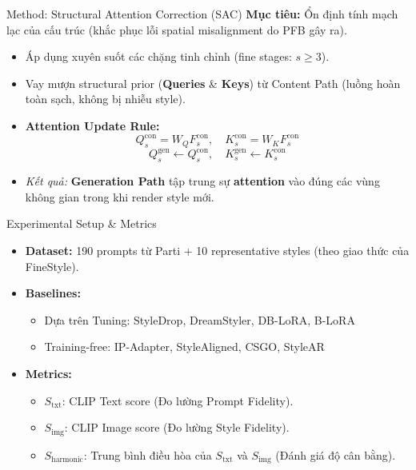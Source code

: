 \documentclass[aspectratio=169, 10pt]{beamer}
\begin{document}
	\begin{frame}{Method: Structural Attention Correction (SAC)}
		\textbf{Mục tiêu:} Ổn định tính mạch lạc của cấu trúc (khắc phục lỗi spatial misalignment do PFB gây ra).
		\begin{itemize}
			\item Áp dụng xuyên suốt các chặng tinh chỉnh (fine stages: $s \ge 3$).
			\item Vay mượn structural prior (\textbf{Queries} \& \textbf{Keys}) từ Content Path (luồng hoàn toàn sạch, không bị nhiễu style).
			\item \textbf{Attention Update Rule:}
			\begin{equation}
				Q_s^{\text{con}} = {W}_Q F_s^{\text{con}},\quad K_s^{\text{con}} = {W}_K F_s^{\text{con}}
			\end{equation}
			\begin{equation}
				Q_s^\text{gen} \leftarrow Q_s^\text{con}, \quad K_s^\text{gen} \leftarrow K_s^\text{con}
			\end{equation}
			\item \textit{Kết quả:} \textbf{Generation Path} tập trung sự \textbf{attention} vào đúng các vùng không gian trong khi render style mới.
		\end{itemize}
	\end{frame}
	
	\begin{frame}{Experimental Setup \& Metrics}
		\begin{itemize}
			\item \textbf{Dataset:} 190 prompts từ Parti + 10 representative styles (theo giao thức của FineStyle).
			\item \textbf{Baselines:} 
			\begin{itemize}
				\item Dựa trên Tuning: StyleDrop, DreamStyler, DB-LoRA, B-LoRA
				\item Training-free: IP-Adapter, StyleAligned, CSGO, StyleAR
			\end{itemize}
			\item \textbf{Metrics:}
			\begin{itemize}
				\item $S_{\text{txt}}$: CLIP Text score (Đo lường Prompt Fidelity).
				\item $S_{\text{img}}$: CLIP Image score (Đo lường Style Fidelity).
				\item $S_{\text{harmonic}}$: Trung bình điều hòa của $S_{\text{txt}}$ và $S_{\text{img}}$ (Đánh giá độ cân bằng).
			\end{itemize}
		\end{itemize}
	\end{frame}
	
\end{document}
